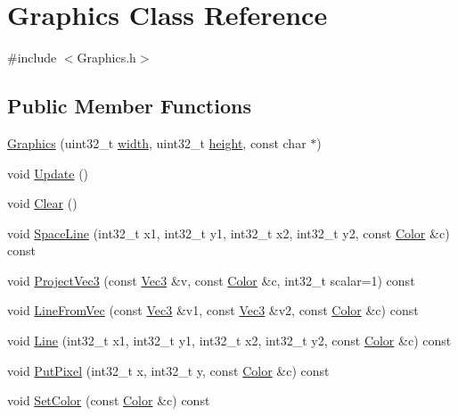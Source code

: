 \hypertarget{class_graphics}{}\section{Graphics Class Reference}
\label{class_graphics}


{\ttfamily \#include $<$Graphics.\+h$>$}

\subsection*{Public Member Functions}
\begin{DoxyCompactItemize}
\item 
\hyperlink{class_graphics_ae363e0a648d3fca0e6748eee9a459ef7}{Graphics} (uint32\+\_\+t \hyperlink{class_graphics_ac23bbc2e5d0d3fec3a48723fd1e64036}{width}, uint32\+\_\+t \hyperlink{class_graphics_aa5c2ca96dd0ee71a689b3bd9d4542a08}{height}, const char $\ast$)
\item 
void \hyperlink{class_graphics_a58bf92a7288028fbd9418fbfda56aacf}{Update} ()
\item 
void \hyperlink{class_graphics_a94d4a9850d1ac4912fb9f492a3b9d7e3}{Clear} ()
\item 
void \hyperlink{class_graphics_a90f7fb17d63c4c22f1957b4a87d262d5}{Space\+Line} (int32\+\_\+t x1, int32\+\_\+t y1, int32\+\_\+t x2, int32\+\_\+t y2, const \hyperlink{class_color}{Color} \&c) const 
\item 
void \hyperlink{class_graphics_aead1266e2271d322105c266477b3909e}{Project\+Vec3} (const \hyperlink{class_vec3}{Vec3} \&v, const \hyperlink{class_color}{Color} \&c, int32\+\_\+t scalar=1) const 
\item 
void \hyperlink{class_graphics_ae00a6cf99c005afb9846451806ef2da6}{Line\+From\+Vec} (const \hyperlink{class_vec3}{Vec3} \&v1, const \hyperlink{class_vec3}{Vec3} \&v2, const \hyperlink{class_color}{Color} \&c) const 
\item 
void \hyperlink{class_graphics_a97ff45556ede17275157206e2c6e54ff}{Line} (int32\+\_\+t x1, int32\+\_\+t y1, int32\+\_\+t x2, int32\+\_\+t y2, const \hyperlink{class_color}{Color} \&c) const 
\item 
void \hyperlink{class_graphics_a8eff75e35561a0246e743ed582786e40}{Put\+Pixel} (int32\+\_\+t x, int32\+\_\+t y, const \hyperlink{class_color}{Color} \&c) const 
\item 
void \hyperlink{class_graphics_a557ef294c52f9d3008d56d915bb5bcd5}{Set\+Color} (const \hyperlink{class_color}{Color} \&c) const 
\item 

\end{DoxyCompactItemize}
